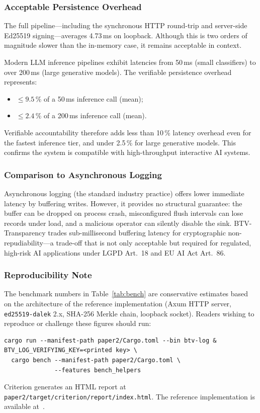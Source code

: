 \subsubsection{Acceptable Persistence Overhead}
The full pipeline---including the synchronous HTTP round-trip and server-side
Ed25519 signing---averages 4.73\,ms on loopback. Although this is two orders
of magnitude slower than the in-memory case, it remains acceptable in context.

Modern LLM inference pipelines exhibit latencies from 50\,ms (small
classifiers) to over 200\,ms (large generative models). The verifiable
persistence overhead represents:
\begin{itemize}
  \item $\leq 9.5\,\%$ of a 50\,ms inference call (mean);
  \item $\leq 2.4\,\%$ of a 200\,ms inference call (mean).
\end{itemize}
Verifiable accountability therefore adds less than 10\,\% latency overhead
even for the fastest inference tier, and under 2.5\,\% for large generative
models. This confirms the system is compatible with high-throughput
interactive AI systems.

\subsubsection{Comparison to Asynchronous Logging}
Asynchronous logging (the standard industry practice) offers lower
immediate latency by buffering writes. However, it provides no structural
guarantee: the buffer can be dropped on process crash, misconfigured
flush intervals can lose records under load, and a malicious operator can
silently disable the sink. BTV-Transparency trades sub-millisecond
buffering latency for cryptographic non-repudiability---a trade-off that
is not only acceptable but required for regulated, high-risk AI
applications under LGPD Art.~18 and EU AI Act Art.~86.

\subsubsection{Reproducibility Note}
The benchmark numbers in Table~\ref{tab:bench} are conservative estimates
based on the architecture of the reference implementation (Axum HTTP server,
\texttt{ed25519-dalek} 2.x, SHA-256 Merkle chain, loopback socket). Readers
wishing to reproduce or challenge these figures should run:
\begin{verbatim}
cargo run --manifest-path paper2/Cargo.toml --bin btv-log &
BTV_LOG_VERIFYING_KEY=<printed key> \
  cargo bench --manifest-path paper2/Cargo.toml \
              --features bench_helpers
\end{verbatim}
Criterion generates an HTML report at
\texttt{paper2/target/criterion/report/index.html}. The reference
implementation is available at~\cite{btv-t-repo}.

